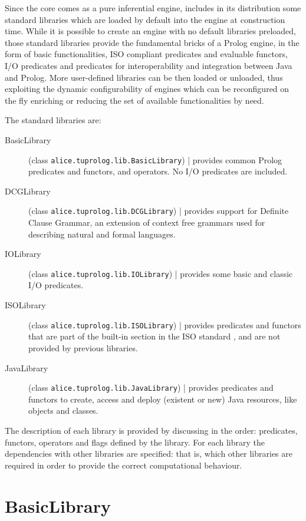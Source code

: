 Since the core comes as a pure inferential engine, \tuprolog{}
includes in its distribution some standard libraries which are
loaded by default into the engine at construction time. While it is
possible to create an engine with no default libraries preloaded,
those standard libraries provide the fundamental bricks of a Prolog
engine, in the form of basic functionalities, ISO compliant
predicates and evaluable functors, I/O predicates and predicates for
interoperability and integration between Java and Prolog.
%
More user-defined libraries can be then loaded or unloaded, thus
exploiting the dynamic configurability of \tuprolog{} engines which
can be reconfigured on the fly enriching or reducing the set of
available functionalities by need.

The standard libraries are:
%
\begin{description}
\item[BasicLibrary] (class \texttt{alice.tuprolog.lib.BasicLibrary}) |
  provides common Prolog predicates and functors, and operators. No
  I/O predicates are included.
%
\item[DCGLibrary] (class \texttt{alice.tuprolog.lib.DCGLibrary}) |
provides support for Definite Clause Grammar, an extension of context
free grammars used for describing natural and formal languages.
%
\item[IOLibrary] (class \texttt{alice.tuprolog.lib.IOLibrary}) |
provides some basic and classic I/O predicates.
%
\item[ISOLibrary] (class \texttt{alice.tuprolog.lib.ISOLibrary}) |
provides predicates and functors that are part of the built-in
section in the ISO standard \cite{iso95}, and are not provided by
previous libraries.
%
\item[JavaLibrary] (class \texttt{alice.tuprolog.lib.JavaLibrary}) |
provides predicates and functors to create, access and deploy
(existent or new) Java resources, like objects and classes.
%
\end{description}
%
\noindent The description of each library is provided by discussing in
the order: predicates, functors, operators and flags defined by the
library.
%
For each library the dependencies with other libraries are specified:
%
that is, which other libraries are required in order to provide the
correct computational behaviour.
%

\section{BasicLibrary}
\label{sec:basic-library}

